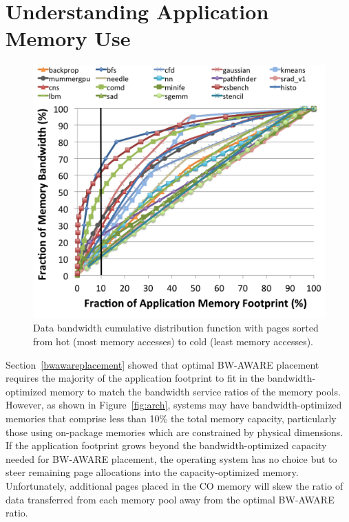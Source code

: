 \section{Understanding Application Memory Use}
\label{constrainedcapacity}

\begin{figure}[t]
    \includegraphics[width=\columnwidth]{asplos2015/figures/cdf.png} 
    \caption{Data bandwidth cumulative distribution function with pages sorted from hot (most memory accesses) to cold (least memory accesses).}
    \label{fig:cdf}
\end{figure}

Section~\ref{bwawareplacement} showed that optimal BW-AWARE placement requires
the majority of the application footprint to fit in the bandwidth-optimized memory
to match the bandwidth service ratios of the memory pools.
However, as shown in Figure~\ref{fig:arch}, systems may have bandwidth-optimized
memories that comprise less than 10\% the total memory capacity, particularly those using
on-package memories which are constrained by physical dimensions. If the application footprint
grows beyond the bandwidth-optimized capacity needed for BW-AWARE placement, the operating system
has no choice but to steer remaining page allocations into the capacity-optimized memory.
Unfortunately, additional pages placed in the CO memory will skew the
ratio of data transferred from each memory pool away from the optimal BW-AWARE ratio.

